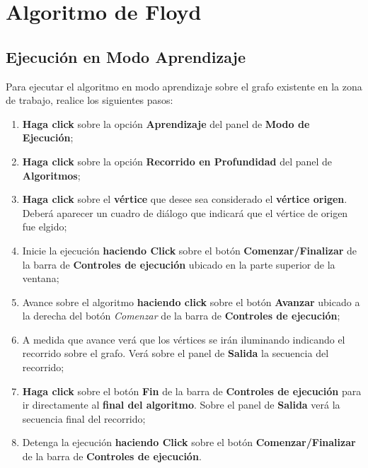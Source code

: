 \documentclass{book}
\begin{document}
%
%
\chapter{Algoritmo de Floyd}


\section{Ejecución en Modo Aprendizaje}

Para ejecutar el algoritmo en modo aprendizaje sobre el grafo existente en la zona de trabajo, realice los siguientes pasos:
\medskip

\begin{enumerate}
	\itemsep=8pt \topsep=0pt \partopsep=0pt \parskip=0pt \parsep=0pt

	\item \textbf{Haga click} sobre la opción \textbf{Aprendizaje} del panel de \textbf{Modo de Ejecución};

	\item \textbf{Haga click} sobre la opción \textbf{Recorrido en Profundidad} del panel de \textbf{Algoritmos};

	\item \textbf{Haga click} sobre el \textbf{vértice} que desee sea considerado el \textbf{vértice origen}. Deberá aparecer un cuadro de diálogo que indicará que el vértice de origen fue elgido;

	\item Inicie la ejecución \textbf{haciendo Click} sobre el botón \textbf{Comenzar/Finalizar} de la barra de \textbf{Controles de ejecución} ubicado en la parte superior de la ventana;

	\item Avance sobre el algoritmo \textbf{haciendo click} sobre el botón \textbf{Avanzar} ubicado a la derecha del botón \textit{Comenzar} de la barra de \textbf{Controles de ejecución};

	\item A medida que avance verá que los vértices se irán iluminando indicando el recorrido sobre el grafo. Verá sobre el panel de \textbf{Salida} la secuencia del recorrido;

	\item \textbf{Haga click} sobre el botón \textbf{Fin} de la barra de \textbf{Controles de ejecución} para ir directamente al \textbf{final del algoritmo}. Sobre el panel de \textbf{Salida} verá la secuencia final del recorrido;

	\item Detenga la ejecución \textbf{haciendo Click} sobre el botón \textbf{Comenzar/Finalizar} de la barra de \textbf{Controles de ejecución}.

\end{enumerate}
\medskip
\end{document}
